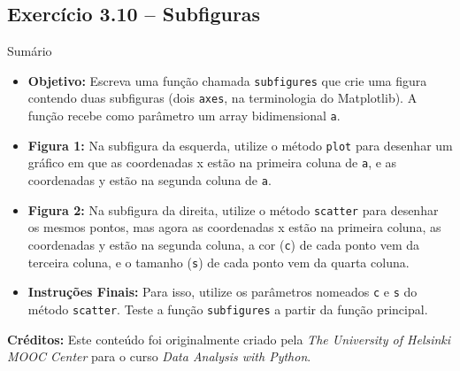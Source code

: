 \documentclass[11pt,a4paper]{article}
\begin{document}
\subsection*{Exercício 3.10 -- Subfiguras}
\begin{exercicio}{Sumário}
\begin{itemize}
    \item \textbf{Objetivo:} Escreva uma função chamada \texttt{subfigures} que crie uma figura contendo duas subfiguras (dois \texttt{axes}, na terminologia do Matplotlib). A função recebe como parâmetro um array bidimensional \texttt{a}.
    \item \textbf{Figura 1:} Na subfigura da esquerda, utilize o método \texttt{plot} para desenhar um gráfico em que as coordenadas x estão na primeira coluna de \texttt{a}, e as coordenadas y estão na segunda coluna de \texttt{a}.
    \item \textbf{Figura 2:} Na subfigura da direita, utilize o método \texttt{scatter} para desenhar os mesmos pontos, mas agora as coordenadas x estão na primeira coluna, as coordenadas y estão na segunda coluna, a cor (\texttt{c}) de cada ponto vem da terceira coluna, e o tamanho (\texttt{s}) de cada ponto vem da quarta coluna. 
    \item \textbf{Instruções Finais:} Para isso, utilize os parâmetros nomeados \texttt{c} e \texttt{s} do método \texttt{scatter}. Teste a função \texttt{subfigures} a partir da função principal.
\end{itemize}
\end{exercicio}

\vspace{2em}
\noindent\textbf{Créditos:} Este conteúdo foi originalmente criado pela \textit{The University of Helsinki MOOC Center} para o curso \textit{Data Analysis with Python}.
\end{document}
